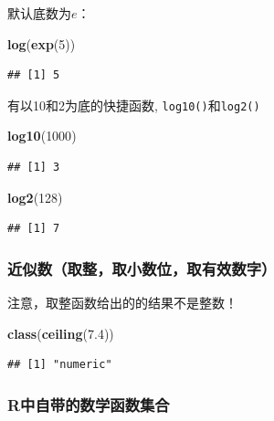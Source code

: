 \documentclass[]{book}
\newenvironment{Shaded}{\begin{snugshade}}{\end{snugshade}}
\newcommand{\DecValTok}[1]{\textcolor[rgb]{0.00,0.00,0.81}{#1}}
\newcommand{\FloatTok}[1]{\textcolor[rgb]{0.00,0.00,0.81}{#1}}
\newcommand{\KeywordTok}[1]{\textcolor[rgb]{0.13,0.29,0.53}{\textbf{#1}}}
\newcommand{\NormalTok}[1]{#1}
\begin{document}
默认底数为\(e\)：

\begin{Shaded}
\begin{Highlighting}[]
\KeywordTok{log}\NormalTok{(}\KeywordTok{exp}\NormalTok{(}\DecValTok{5}\NormalTok{))}
\end{Highlighting}
\end{Shaded}

\begin{verbatim}
## [1] 5
\end{verbatim}

有以10和2为底的快捷函数, \texttt{log10()}和\texttt{log2()}

\begin{Shaded}
\begin{Highlighting}[]
\KeywordTok{log10}\NormalTok{(}\DecValTok{1000}\NormalTok{)}
\end{Highlighting}
\end{Shaded}

\begin{verbatim}
## [1] 3
\end{verbatim}

\begin{Shaded}
\begin{Highlighting}[]
\KeywordTok{log2}\NormalTok{(}\DecValTok{128}\NormalTok{)}
\end{Highlighting}
\end{Shaded}

\begin{verbatim}
## [1] 7
\end{verbatim}

\hypertarget{quzheng}{%
\subsubsection{近似数（取整，取小数位，取有效数字）}\label{quzheng}}

注意，取整函数给出的的结果不是整数！

\begin{Shaded}
\begin{Highlighting}[]
\KeywordTok{class}\NormalTok{(}\KeywordTok{ceiling}\NormalTok{(}\FloatTok{7.4}\NormalTok{))}
\end{Highlighting}
\end{Shaded}

\begin{verbatim}
## [1] "numeric"
\end{verbatim}

\hypertarget{r}{%
\subsubsection{R中自带的数学函数集合}\label{r}}
\end{document}
